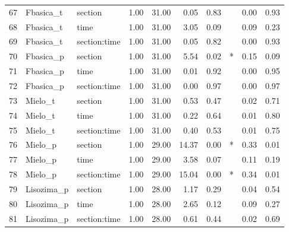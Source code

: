 \begin{table}[ht]
\begin{tabular}{rllrrrrlrr}
  67 & Fbasica\_t & section & 1.00 & 31.00 & 0.05 & 0.83 &  & 0.00 & 0.93 \\ 
  68 & Fbasica\_t & time & 1.00 & 31.00 & 3.05 & 0.09 &  & 0.09 & 0.23 \\ 
  69 & Fbasica\_t & section:time & 1.00 & 31.00 & 0.05 & 0.82 &  & 0.00 & 0.93 \\ 
  70 & Fbasica\_p & section & 1.00 & 31.00 & 5.54 & 0.02 & * & 0.15 & 0.09 \\ 
  71 & Fbasica\_p & time & 1.00 & 31.00 & 0.01 & 0.92 &  & 0.00 & 0.95 \\ 
  72 & Fbasica\_p & section:time & 1.00 & 31.00 & 0.00 & 0.97 &  & 0.00 & 0.97 \\ 
  73 & Mielo\_t & section & 1.00 & 31.00 & 0.53 & 0.47 &  & 0.02 & 0.71 \\ 
  74 & Mielo\_t & time & 1.00 & 31.00 & 0.22 & 0.64 &  & 0.01 & 0.80 \\ 
  75 & Mielo\_t & section:time & 1.00 & 31.00 & 0.40 & 0.53 &  & 0.01 & 0.75 \\ 
  76 & Mielo\_p & section & 1.00 & 29.00 & 14.37 & 0.00 & * & 0.33 & 0.01 \\ 
  77 & Mielo\_p & time & 1.00 & 29.00 & 3.58 & 0.07 &  & 0.11 & 0.19 \\ 
  78 & Mielo\_p & section:time & 1.00 & 29.00 & 15.04 & 0.00 & * & 0.34 & 0.01 \\ 
  79 & Lisozima\_p & section & 1.00 & 28.00 & 1.17 & 0.29 &  & 0.04 & 0.54 \\ 
  80 & Lisozima\_p & time & 1.00 & 28.00 & 2.65 & 0.12 &  & 0.09 & 0.27 \\ 
  81 & Lisozima\_p & section:time & 1.00 & 28.00 & 0.61 & 0.44 &  & 0.02 & 0.69 \\ 
   \hline
\end{tabular}
\end{table}
